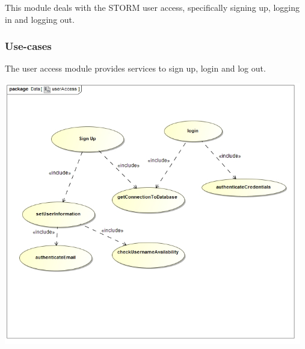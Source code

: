 This module deals with the STORM user access, specifically signing up, logging in and logging out.

\subsubsection{Use-cases}
The user access module provides services to sign up, login and log out.\par
\includegraphics[width=13cm]{./graphics/userAccessUseCase.jpg}
    \rule{0\linewidth}{0.15\linewidth}\par
